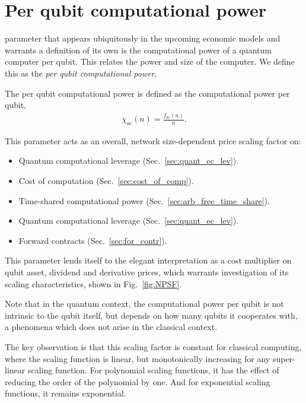 \section{Per qubit computational power}\label{sec:NPSF}

 parameter that appears ubiquitously in the upcoming economic models and warrants a definition of its own is the computational power of a quantum computer per qubit. This relates the power and size of the computer. We define this as the \textit{per qubit computational power},

\begin{definition}\label{def:NPSF}
The per qubit computational power is defined as the computational power per qubit,
\begin{align}
\chi_\mathrm{sc}(n) = \frac{f_\mathrm{sc}(n)}{n}.
\end{align}
\end{definition}

This parameter acts as an overall, network size-dependent price scaling factor on:
\begin{itemize}
\item Quantum computational leverage (Sec.~\ref{sec:quant_ec_lev}).
\item Cost of computation (Sec.~\ref{sec:cost_of_comp}).
\item Time-shared computational power (Sec.~\ref{sec:arb_free_time_share}).
\item Quantum computational leverage (Sec.~\ref{sec:quant_ec_lev}).
\item Forward contracts (Sec.~\ref{sec:for_contr}).
\end{itemize}

This parameter lends itself to the elegant interpretation as a cost multiplier on qubit asset, dividend and derivative prices, which warrants investigation of its scaling characteristics, shown in Fig.~\ref{fig:NPSF}. 

Note that in the quantum context, the computational power per qubit is not intrinsic to the qubit itself, but depends on how many qubits it cooperates with, a phenomena which does not arise in the classical context.

The key observation is that this scaling factor is constant for classical computing, where the scaling function is linear, but monotonically increasing for any super-linear scaling function. For polynomial scaling functions, it has the effect of reducing the order of the polynomial by one. And for exponential scaling functions, it remains exponential.


